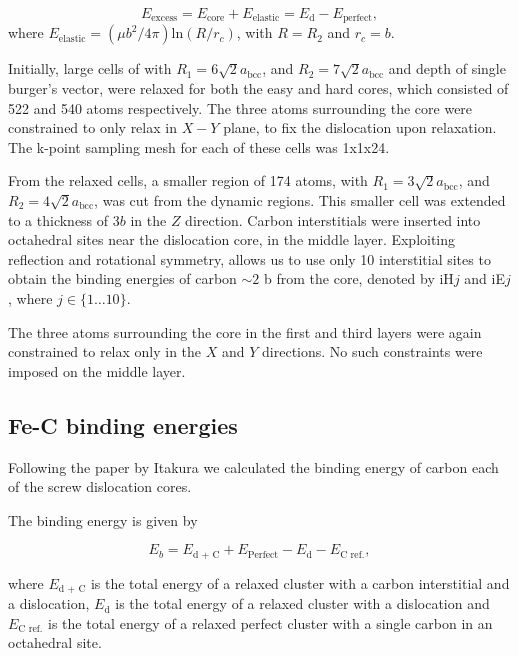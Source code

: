\documentclass[a4paper,11pt]{article}
\begin{document}
\begin{equation}
 E_{\text{excess}} =   E_{\text{core}} + E_{\text{elastic}} = E_{\text{d}} - E_{\text{perfect}}   ,\label{eq:excessenergy}
 \end{equation} 
where
\(E_{\text{elastic}} = ( \mu b^2 / 4\pi )\text{ln}(R/ r_c)\), with \(R = R_2\) and \(r_c = b\).

Initially, large cells of with \(R_1 = 6\sqrt{2}a_{\text{bcc}}\), and \(R_2 =
   7\sqrt{2}a_{\text{bcc}}\) and depth of single burger's vector, were relaxed
for both the easy and hard cores, which consisted of 522 and 540 atoms
respectively. The three atoms surrounding the core were constrained to only
relax in \(X-Y\) plane, to fix the dislocation upon relaxation. 
The k-point sampling mesh for each of these cells was 1x1x24.

From the relaxed cells, a smaller region of 174 atoms, with \(R_1 =
   3\sqrt{2}a_{\text{bcc}}\), and \(R_2 = 4\sqrt{2}a_{\text{bcc}}\), was cut from
the dynamic regions. This smaller cell was extended to a thickness of 3\(b\) in
the \(Z\) direction. Carbon interstitials were inserted into octahedral sites
near the dislocation core, in the middle layer. Exploiting reflection and
rotational symmetry, allows us to use only 10 interstitial
sites to obtain the binding energies of carbon \(\sim2\) b from the core, denoted by iH\(j\) and iE\(j\),
where \(j \in \{1\dots10\}\). 

The three atoms surrounding the core in the first and third layers were again
constrained to relax only in the \(X\) and \(Y\) directions. No such constraints
were imposed on the middle layer. 


\subsection{Fe-C binding energies}
\label{sec:org0a68c41}
Following the paper by Itakura
\cite{itakura13_effec_hydrog_atoms_screw_disloc} we calculated the
binding energy of carbon each of the screw dislocation cores. 

The binding energy is given by 

\begin{equation}  
E_b = E_{\text{d + C}} + E_{\text{Perfect}}- E_{\text{d}} - E_{\text{C ref.}},    
\end{equation}

where \(E_{\text{d + C}}\) is the total energy of a relaxed cluster with a
carbon interstitial and a dislocation, \(E_{\text{d}}\) is the total
energy of a relaxed cluster with a dislocation and \(E_{\text{C
    ref.}}\) is the total energy of a relaxed perfect cluster with a single carbon in
an octahedral site.
\end{document}
